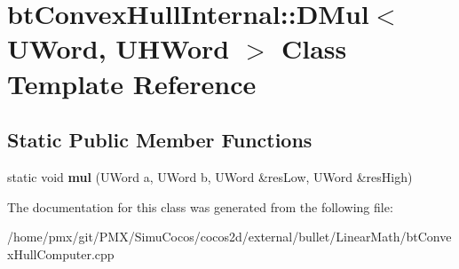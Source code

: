 \hypertarget{classbtConvexHullInternal_1_1DMul}{}\section{bt\+Convex\+Hull\+Internal\+:\+:D\+Mul$<$ U\+Word, U\+H\+Word $>$ Class Template Reference}
\label{classbtConvexHullInternal_1_1DMul}
\subsection*{Static Public Member Functions}
\begin{DoxyCompactItemize}
\item 
\mbox{\label{classbtConvexHullInternal_1_1DMul_a7e5a2767d9b01e7ab224381c029b2cbb}} 
static void {\bfseries mul} (U\+Word a, U\+Word b, U\+Word \&res\+Low, U\+Word \&res\+High)
\end{DoxyCompactItemize}


The documentation for this class was generated from the following file\+:\begin{DoxyCompactItemize}
\item 
/home/pmx/git/\+P\+M\+X/\+Simu\+Cocos/cocos2d/external/bullet/\+Linear\+Math/bt\+Convex\+Hull\+Computer.\+cpp\end{DoxyCompactItemize}
